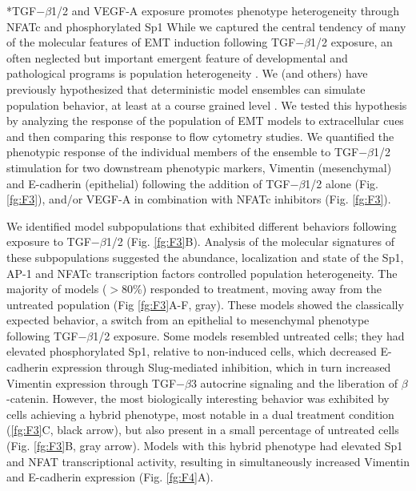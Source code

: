 \documentclass[12pt]{article}
\makeatletter
\renewcommand\subsection{\@startsection
	{subsection}{2}{0mm}
	{-0.05in}
	{-0.5\baselineskip}
	{\normalfont\normalsize\bfseries}}
\makeatother
\begin{document}
\clearpage

\subsection*{TGF$-\beta$1/2 and VEGF-A exposure promotes phenotype heterogeneity through NFATc and phosphorylated Sp1}
While we captured the central tendency of many of the molecular features of EMT induction following TGF$-\beta$1/2 exposure, an often neglected but important emergent
feature of developmental and pathological programs is population heterogeneity \citep{Park:2010fu}.
We (and others) have previously hypothesized that deterministic model ensembles can simulate population behavior, at least at a course grained level \citep{Lequieu:2011fj}.
We tested this hypothesis by analyzing the response of the population of EMT models to extracellular cues and then comparing this response to flow cytometry studies.
We quantified the phenotypic response of the individual members of the ensemble to TGF$-\beta$1/2 stimulation for two downstream phenotypic markers, Vimentin (mesenchymal) and E-cadherin (epithelial) following the addition of TGF$-\beta$1/2 alone (Fig. \ref{fg:F3}), and/or VEGF-A in combination with NFATc inhibitors (Fig. \ref{fg:F3}).

We identified model subpopulations that exhibited different behaviors following exposure to TGF$-\beta$1/2 (Fig. \ref{fg:F3}B).
Analysis of the molecular signatures of these subpopulations suggested the abundance, localization and state of the Sp1, AP-1 and NFATc transcription factors controlled population heterogeneity.
The majority of models ($>$80\%) responded to treatment, moving away from the untreated population (Fig \ref{fg:F3}A-F, gray).
These models showed the classically expected behavior, a switch from an epithelial to mesenchymal phenotype following TGF$-\beta$1/2 exposure.
Some models resembled untreated cells; they had elevated phosphorylated Sp1, relative to non-induced cells,
which decreased E-cadherin expression through Slug-mediated inhibition, which in turn increased Vimentin expression through TGF$-\beta$3 autocrine signaling and the liberation of $\beta$-catenin. However, the most biologically interesting behavior was exhibited by cells achieving a hybrid phenotype, most notable in a dual treatment condition (\ref{fg:F3}C, black arrow), but also present in a small percentage of untreated cells (Fig. \ref{fg:F3}B, gray arrow).
Models with this hybrid phenotype had elevated Sp1 and NFAT transcriptional activity, resulting in simultaneously increased Vimentin and E-cadherin expression (Fig. \ref{fg:F4}A).
\end{document}
